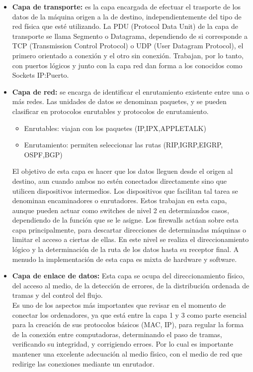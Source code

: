 \documentclass[a4paper,11pt]{article}
\begin{document}
\begin{itemize}
\item \textbf{Capa de transporte:} es la capa encargada de efectuar el trasporte de los datos de la máquina origen a la de destino, independientemente del tipo de red física que esté utilizando. La PDU (Protocol Data Unit) de la capa de transporte se llama Segmento o Datagrama, dependiendo de si corresponde a TCP (Transmission Control Protocol) o UDP (User Datagram Protocol), el primero orientado a conexión y el otro sin conexión. Trabajan, por lo tanto, con puertos lógicos y junto con la capa red dan forma a los conocidos como Sockets IP:Puerto.

\item \textbf{Capa de red:} se encarga de identificar el enrutamiento existente entre una o más redes. Las unidades de datos se denominan paquetes, y se pueden clasificar en protocolos enrutables y protocolos de enrutamiento. 

	\begin{itemize}
		\item Enrutables: viajan con los paquetes (IP,IPX,APPLETALK)
		\item Enrutamiento: permiten seleccionar las rutas (RIP,IGRP,EIGRP, \newline OSPF,BGP)
	\end{itemize}

El objetivo de esta capa es hacer que los datos lleguen desde el origen al destino, aun cuando ambos no estén conectados directamente sino que utilicen dispositivos intermedios. Los dispositivos que facilitan tal tarea se denominan encaminadores o enrutadores. Estos trabajan en esta capa, aunque pueden actuar como switches de nivel 2 en determiandos casos, dependiendo de la función que se le asigne. Los firewalls actúan sobre esta capa principalmente, para descartar direcciones de determinadas máquinas o limitar el acceso a ciertas de ellas. En este nivel se realiza el direccionamiento lógico y la determinación de la ruta de los datos hasta su receptor final. A menudo la implementación de esta capa es mixta de hardware y software.

\item \textbf{Capa de enlace de datos:} Esta capa se ocupa del direccionamiento físico, del acceso al medio, de la detección de errores, de la distribución ordenada de tramas y del control del flujo. \\

Es uno de los aspectos más importantes que revisar en el momento de conectar los ordenadores, ya que está entre la capa 1 y 3 como parte esencial para la creación de sus protocolos básicos (MAC, IP), para regular la forma de la conexión entre computadoras, determinando el paso de tramas, verificando su integridad, y corrigiendo erroes. Por lo cual es importante mantener una excelente adecuación al medio físico, con el medio de red que redirige las conexiones mediante un enrutador. \\


\end{itemize}
\end{document}
